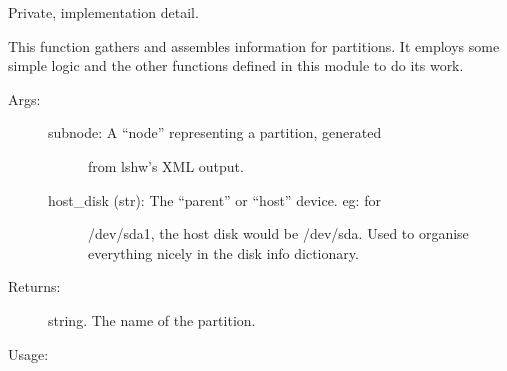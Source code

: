 \documentclass[letterpaper,10pt,english]{sphinxmanual}
\begin{document}
\begin{fulllineitems}
\label{\detokenize{linux:getdevinfo.linux.get_partition_info}}
Private, implementation detail.

This function gathers and assembles information for partitions.
It employs some simple logic and the other functions defined in this
module to do its work.
\begin{description}
\item[{Args:}] \leavevmode\begin{description}
\item[{subnode:            A “node” representing a partition, generated}] \leavevmode
from lshw’s XML output.

\item[{host\_disk (str):    The “parent” or “host” device. eg: for}] \leavevmode
/dev/sda1, the host disk would be /dev/sda.
Used to organise everything nicely in the
disk info dictionary.

\end{description}

\item[{Returns:}] \leavevmode
string.     The name of the partition.

\end{description}

Usage:

\begin{sphinxVerbatim}[commandchars=\\\{\}]
  
\end{sphinxVerbatim}

\end{fulllineitems}

\end{document}
